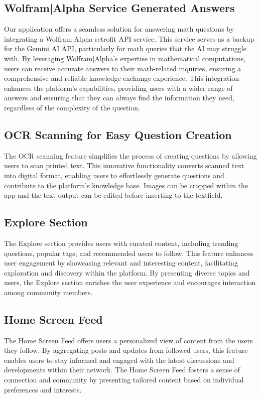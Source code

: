 \subsection{Wolfram|Alpha Service Generated Answers}

Our application offers a seamless solution for answering math questions by integrating a Wolfram|Alpha retrofit API service. This service serves as a backup for the Gemini AI API, particularly for math queries that the AI may struggle with. By leveraging Wolfram|Alpha's expertise in mathematical computations, users can receive accurate answers to their math-related inquiries, ensuring a comprehensive and reliable knowledge exchange experience. This integration enhances the platform's capabilities, providing users with a wider range of answers and ensuring that they can always find the information they need, regardless of the complexity of the question.

\subsection{OCR Scanning for Easy Question Creation}

The OCR scanning feature simplifies the process of creating questions by allowing users to scan printed text. This innovative functionality converts scanned text into digital format, enabling users to effortlessly generate questions and contribute to the platform's knowledge base. Images can be cropped within the app and the text output can be edited before inserting to the textfield.

\subsection{Explore Section}

The Explore section provides users with curated content, including trending questions, popular tags, and recommended users to follow. This feature enhances user engagement by showcasing relevant and interesting content, facilitating exploration and discovery within the platform. By presenting diverse topics and users, the Explore section enriches the user experience and encourages interaction among community members.

\subsection{Home Screen Feed}

The Home Screen Feed offers users a personalized view of content from the users they follow. By aggregating posts and updates from followed users, this feature enables users to stay informed and engaged with the latest discussions and developments within their network. The Home Screen Feed fosters a sense of connection and community by presenting tailored content based on individual preferences and interests.

